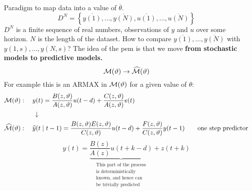 Paradigm to map data into a value of $\overline{\theta}$.
$$
	D^N=\left\{\overline{y(1)},\ldots,\overline{y(N)},\overline{u(1)},\ldots,\overline{u(N)}\right\}
$$
$D^N$ is a finite sequence of real numbers, observations of $y$ and $u$ over some horizon. $N$ is the length of the dataset.
How to compare $\overline{y(1)},\ldots,\overline{y(N)}$ with $y(1,s),\ldots,y(N,s)$?
The idea of the \gls{pem} is that we move \textbf{from stochastic models to predictive models.}
\[
	\mathcal{M}(\vartheta) \to \widehat{\mathcal{M}}(\vartheta)
\]
For example this is an ARMAX in $\mathcal{M}(\vartheta)$ for a given value of $\theta$:
\begin{align*}
	\mathcal{M}(\vartheta)&:\quad y(t)=\frac{B(z, \vartheta)}{A(z, \vartheta)} u(t-d)+\frac{C(z, \vartheta)}{A(z, \vartheta)} e(t)\\
	&\qquad\downarrow\\
	\widehat{\mathcal{M}}(\vartheta)&: \quad \widehat{y}(t \mid t-1) =\frac{B(z,\vartheta) E(z,\vartheta)}{C(z,\vartheta)} u(t-d)+\frac{F(z,\vartheta)}{C(z,\vartheta)} y(t-1) \qquad \text{one step predictor}
\end{align*}
$$y(t)=\underbrace{\frac{B(z)}{A(z)} u(t+k-d)}_{\substack{\text{This part of the process}\\ 
		\text{is deterministically}\\
		\text{known, and hence can}\\
		\text{be trivially predicted}}} +z(t+k)$$